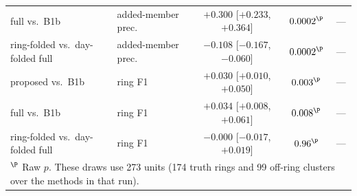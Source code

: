 \begin{table}[t]
\begin{tabular}{llccc}
full vs.\ B1b & added-member prec. & $+0.300$ [$+0.233$, $+0.364$] & $0.0002^{\P}$ & --- \\ %
ring-folded vs.\ day-folded full & added-member prec. & $-0.108$ [$-0.167$, $-0.060$] & $0.0002^{\P}$ & --- \\ %
proposed vs.\ B1b & ring F1 & $+0.030$ [$+0.010$, $+0.050$] & $0.003^{\P}$ & --- \\ %
full vs.\ B1b & ring F1 & $+0.034$ [$+0.008$, $+0.061$] & $0.008^{\P}$ & --- \\ %
ring-folded vs.\ day-folded full & ring F1 & $-0.000$ [$-0.017$, $+0.019$] & $0.96^{\P}$ & --- \\ %
\bottomrule
\multicolumn{5}{l}{\footnotesize $^{\P}$ Raw $p$. These draws use 273 units (174 truth rings and 99 off-ring clusters over the methods in that run).}\\
\end{tabular}
\end{table}

